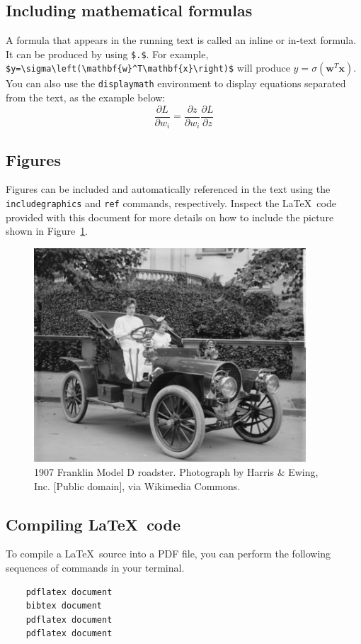 \documentclass[acmsmall,nonacm]{acmart}
\begin{document}
\subsection{Including mathematical formulas}
A formula that appears in the running text is called an inline or in-text formula.  It can be produced by using \verb|$.$|.  For example, \verb|$y=\sigma\left(\mathbf{w}^T\mathbf{x}\right)$| will produce $y=\sigma\left(\mathbf{w}^T\mathbf{x}\right)$.  You can also use the \verb|displaymath| environment to display equations separated from the text, as the example below:
\begin{displaymath}
    \frac{\partial L}{\partial w_i} = \frac{\partial z}{\partial w_i} \frac{\partial L}{\partial z}
\end{displaymath}

\subsection{Figures}
Figures can be included and automatically referenced in the text using the \verb|includegraphics| and \verb|ref| commands, respectively.  Inspect the \LaTeX\ code provided with this document for more details on how to include the picture shown in Figure~\ref{f:roadster}.

\begin{figure}[h!]
    \centering
    \includegraphics[width=4in]{sample}
    \caption{1907 Franklin Model D roadster. Photograph by Harris \& Ewing, Inc. [Public domain], via Wikimedia Commons.}
    \label{f:roadster}
\end{figure}

\subsection{Compiling \LaTeX\ code}
To compile a \LaTeX\ source into a PDF file, you can perform the following sequences of commands in your terminal.
\begin{verbatim}
    pdflatex document
    bibtex document
    pdflatex document
    pdflatex document
\end{verbatim}


 
\end{document}
